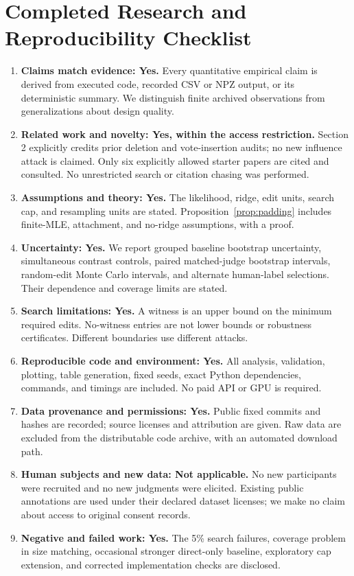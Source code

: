 \documentclass{article}
\begin{document}
\section{Completed Research and Reproducibility Checklist}
\begin{enumerate}
\item \textbf{Claims match evidence: Yes.} Every quantitative empirical claim is derived from executed code, recorded CSV or NPZ output, or its deterministic summary. We distinguish finite archived observations from generalizations about design quality.
\item \textbf{Related work and novelty: Yes, within the access restriction.} Section 2 explicitly credits prior deletion and vote-insertion audits; no new influence attack is claimed. Only six explicitly allowed starter papers are cited and consulted. No unrestricted search or citation chasing was performed.
\item \textbf{Assumptions and theory: Yes.} The likelihood, ridge, edit units, search cap, and resampling units are stated. Proposition~\ref{prop:padding} includes finite-MLE, attachment, and no-ridge assumptions, with a proof.
\item \textbf{Uncertainty: Yes.} We report grouped baseline bootstrap uncertainty, simultaneous contrast controls, paired matched-judge bootstrap intervals, random-edit Monte Carlo intervals, and alternate human-label selections. Their dependence and coverage limits are stated.
\item \textbf{Search limitations: Yes.} A witness is an upper bound on the minimum required edits. No-witness entries are not lower bounds or robustness certificates. Different boundaries use different attacks.
\item \textbf{Reproducible code and environment: Yes.} All analysis, validation, plotting, table generation, fixed seeds, exact Python dependencies, commands, and timings are included. No paid API or GPU is required.
\item \textbf{Data provenance and permissions: Yes.} Public fixed commits and hashes are recorded; source licenses and attribution are given. Raw data are excluded from the distributable code archive, with an automated download path.
\item \textbf{Human subjects and new data: Not applicable.} No new participants were recruited and no new judgments were elicited. Existing public annotations are used under their declared dataset licenses; we make no claim about access to original consent records.
\item \textbf{Negative and failed work: Yes.} The 5\% search failures, coverage problem in size matching, occasional stronger direct-only baseline, exploratory cap extension, and corrected implementation checks are disclosed.

\end{enumerate}
\end{document}
